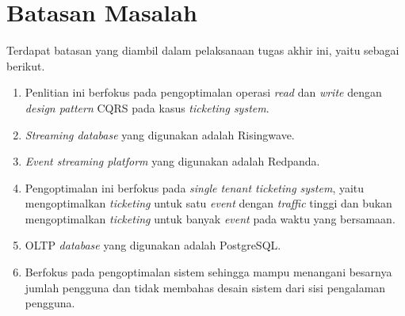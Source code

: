 \section{Batasan Masalah}
\label{sec:batasan-masalah}

Terdapat batasan yang diambil dalam pelaksanaan tugas akhir ini, yaitu sebagai berikut.

\begin{enumerate}
  \item Penlitian ini berfokus pada pengoptimalan operasi \textit{read} dan \textit{write} dengan \textit{design pattern} CQRS pada kasus \textit{ticketing system}.
  \item \textit{Streaming database} yang digunakan adalah Risingwave.
  \item \textit{Event streaming platform} yang digunakan adalah Redpanda.
  \item Pengoptimalan ini berfokus pada \textit{single tenant ticketing system}, yaitu mengoptimalkan \textit{ticketing} untuk satu \textit{event} dengan \textit{traffic} tinggi dan bukan mengoptimalkan \textit{ticketing} untuk banyak \textit{event} pada waktu yang bersamaan.
  \item OLTP \textit{database} yang digunakan adalah PostgreSQL.
  \item Berfokus pada pengoptimalan sistem sehingga mampu menangani besarnya jumlah pengguna dan tidak membahas desain sistem dari sisi pengalaman pengguna.
\end{enumerate}

